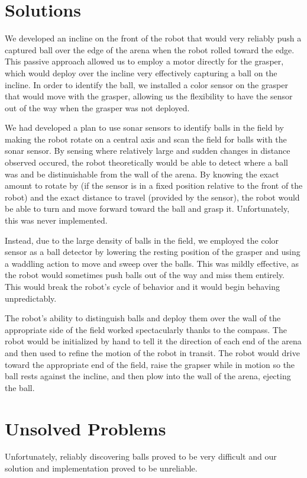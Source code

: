 \documentclass[journal]{../IEEEtran}
\begin{document}
\section{Solutions}\label{S.solutions}
We developed an incline on the front of the robot that would very reliably push a captured ball over the edge of the arena when the robot rolled toward the edge. This passive approach allowed us to employ a motor directly for the grasper, which would deploy over the incline very effectively capturing a ball on the incline. In order to identify the ball, we installed a color sensor on the grasper that would move with the grasper, allowing us the flexibility to have the sensor out of the way when the grasper was not deployed. 

We had developed a plan to use sonar sensors to identify balls in the field by making the robot rotate on a central axis and scan the field for balls with the sonar sensor. By sensing where relatively large and sudden changes in distance observed occured, the robot theoretically would be able to detect where a ball was and be distinuishable from the wall of the arena. By knowing the exact amount to rotate by (if the sensor is in a fixed position relative to the front of the robot) and the exact distance to travel (provided by the sensor), the robot would be able to turn and move forward toward the ball and grasp it. Unfortunately, this was never implemented. 

Instead, due to the large density of balls in the field, we employed the color sensor as a ball detector by lowering the resting position of the grasper and using a waddling action to move and sweep over the balls. This was mildly effective, as the robot would sometimes push balls out of the way and miss them entirely. This would break the robot's cycle of behavior and it would begin behaving unpredictably.

The robot's ability to distinguish balls and deploy them over the wall of the appropriate side of the field worked spectacularly thanks to the compass. The robot would be initialized by hand to tell it the direction of each end of the arena and then used to refine the motion of the robot in transit. The robot would drive toward the appropriate end of the field, raise the grapser while in motion so the ball rests against the incline, and then plow into the wall of the arena, ejecting the ball.

\section{Unsolved Problems}\label{S.unsolved}
Unfortunately, reliably discovering balls proved to be very difficult and our solution and implementation proved to be unreliable. 
\end{document}
